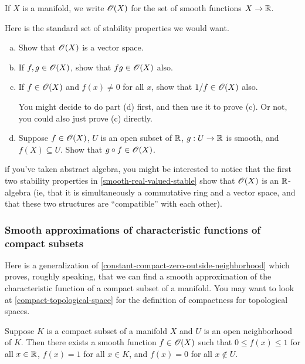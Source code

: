 \begin{definition}
	If $X$ is a manifold, we write $\mathscr{O}(X)$ for the set of smooth functions $X \to \mathbb{R}$. 
\end{definition}

Here is the standard set of stability properties we would want. 

\begin{exercise} \label{smooth-real-valued-stable}
	\begin{enumerate}[(a)]
		\item Show that $\mathscr{O}(X)$ is a vector space. 
		\item If $f, g \in \mathscr{O}(X)$, show that $fg \in \mathscr{O}(X)$ also. 
		\item If $f \in \mathscr{O}(X)$ and $f(x) \neq 0$ for all $x$, show that $1/f \in \mathscr{O}(X)$ also. 
		\begin{hint}
			You might decide to do part (d) first, and then use it to prove (c). Or not, you could also just prove (c) directly. 
		\end{hint}
		\item Suppose $f \in \mathscr{O}(X)$, $U$ is an open subset of $\mathbb{R}$, $g : U \to \mathbb{R}$ is smooth, and $f(X) \subseteq U$. Show that $g \circ f \in \mathscr{O}(X)$. 
	\end{enumerate}
\end{exercise}

\begin{unimportantremark}
	if you've taken abstract algebra, you might be interested to notice that the first two stability properties in \cref{smooth-real-valued-stable} show that $\mathscr{O}(X)$ is an $\mathbb{R}$-algebra (ie, that it is simultaneously a commutative ring and a vector space, and that these two structures are ``compatible'' with each other). 
\end{unimportantremark}

\subsubsection*{Smooth approximations of characteristic functions of compact subsets \starred}

Here is a generalization of \cref{constant-compact-zero-outside-neighborhood} which proves, roughly speaking, that we can find a smooth approximation of the characteristic function of a compact subset of a manifold. You may want to look at \cref{compact-topological-space} for the definition of compactness for topological spaces. 

\begin{proposition} \label{smooth-approximation-characteristic-compact}
	Suppose $K$ is a compact subset of a manifold $X$ and $U$ is an open neighborhood of $K$. Then there exists a smooth function $f \in \mathscr{O}(X)$ such that $0 \leq f(x) \leq 1$ for all $x \in \mathbb{R}$, $f(x) = 1$ for all $x \in K$, and $f(x) = 0$ for all $x \notin U$. 
\end{proposition}

